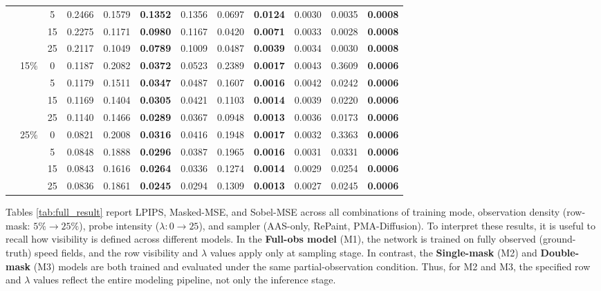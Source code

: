 \documentclass[a4paper,fleqn]{cas-sc}
\numberwithin{equation}{section}
\begin{document}
\begin{table}[width=.99\linewidth,cols=4,pos=b]
\begin{tabular}{llc rrr rrr rrr}
& & 5  & 0.2466 & 0.1579 & \textbf{0.1352} & 0.1356 & 0.0697 & \textbf{0.0124} & 0.0030 & 0.0035 & \textbf{0.0008} \\
& & 15 & 0.2275 & 0.1171 & \textbf{0.0980} & 0.1167 & 0.0420 & \textbf{0.0071} & 0.0033 & 0.0028 & \textbf{0.0008} \\
& & 25 & 0.2117 & 0.1049 & \textbf{0.0789} & 0.1009 & 0.0487 & \textbf{0.0039} & 0.0034 & 0.0030 & \textbf{0.0008} \\
\cmidrule(lr){2-12}
& \multirow{4}{*}{15\%}
& 0  & 0.1187 & 0.2082 & \textbf{0.0372} & 0.0523 & 0.2389 & \textbf{0.0017} & 0.0043 & 0.3609 & \textbf{0.0006} \\
& & 5  & 0.1179 & 0.1511 & \textbf{0.0347} & 0.0487 & 0.1607 & \textbf{0.0016} & 0.0042 & 0.0242 & \textbf{0.0006} \\
& & 15 & 0.1169 & 0.1404 & \textbf{0.0305} & 0.0421 & 0.1103 & \textbf{0.0014} & 0.0039 & 0.0220 & \textbf{0.0006} \\
& & 25 & 0.1140 & 0.1466 & \textbf{0.0289} & 0.0367 & 0.0948 & \textbf{0.0013} & 0.0036 & 0.0173 & \textbf{0.0006} \\
\cmidrule(lr){2-12}
& \multirow{4}{*}{25\%}
& 0  & 0.0821 & 0.2008 & \textbf{0.0316} & 0.0416 & 0.1948 & \textbf{0.0017} & 0.0032 & 0.3363 & \textbf{0.0006} \\
& & 5  & 0.0848 & 0.1888 & \textbf{0.0296} & 0.0387 & 0.1965 & \textbf{0.0016} & 0.0031 & 0.0331 & \textbf{0.0006} \\
& & 15 & 0.0843 & 0.1616 & \textbf{0.0264} & 0.0336 & 0.1274 & \textbf{0.0014} & 0.0029 & 0.0254 & \textbf{0.0006} \\
& & 25 & 0.0836 & 0.1861 & \textbf{0.0245} & 0.0294 & 0.1309 & \textbf{0.0013} & 0.0027 & 0.0245 & \textbf{0.0006} \\
\bottomrule
\end{tabular}
\end{table}

Tables \ref{tab:full_result} report LPIPS, Masked-MSE, and Sobel-MSE across all combinations of training mode, observation density (row-mask: $5 \% \rightarrow 25 \%$), probe intensity ($\lambda: 0 \rightarrow 25$), and sampler (AAS-only, RePaint, PMA-Diffusion). To interpret these results, it is useful to recall how visibility is defined across different models. In the \textbf{Full-obs model} (M1), the network is trained on fully observed (ground-truth) speed fields, and the row visibility and $\lambda$ values apply only at sampling stage. In contrast, the \textbf{Single-mask} (M2) and \textbf{Double-mask} (M3) models are both trained and evaluated under the same partial-observation condition. Thus, for M2 and M3, the specified row and $\lambda$ values reflect the entire modeling pipeline, not only the inference stage.
\end{document}

